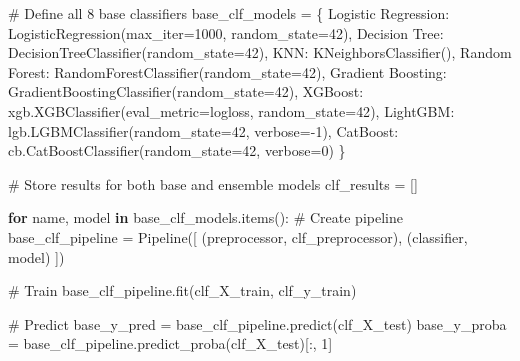 \documentclass[
  letterpaper,
  DIV=11,
  numbers=noendperiod]{scrreprt}
\newenvironment{Shaded}{\begin{snugshade}}{\end{snugshade}}
\newcommand{\CommentTok}[1]{\textcolor[rgb]{0.37,0.37,0.37}{#1}}
\newcommand{\ControlFlowTok}[1]{\textcolor[rgb]{0.00,0.23,0.31}{\textbf{#1}}}
\newcommand{\DecValTok}[1]{\textcolor[rgb]{0.68,0.00,0.00}{#1}}
\newcommand{\KeywordTok}[1]{\textcolor[rgb]{0.00,0.23,0.31}{\textbf{#1}}}
\newcommand{\NormalTok}[1]{\textcolor[rgb]{0.00,0.23,0.31}{#1}}
\newcommand{\OperatorTok}[1]{\textcolor[rgb]{0.37,0.37,0.37}{#1}}
\newcommand{\StringTok}[1]{\textcolor[rgb]{0.13,0.47,0.30}{#1}}
\begin{document}
\begin{Shaded}
\begin{Highlighting}[]
\CommentTok{\# Define all 8 base classifiers}
\NormalTok{base\_clf\_models }\OperatorTok{=}\NormalTok{ \{}
    \StringTok{\textquotesingle{}Logistic Regression\textquotesingle{}}\NormalTok{: LogisticRegression(max\_iter}\OperatorTok{=}\DecValTok{1000}\NormalTok{, random\_state}\OperatorTok{=}\DecValTok{42}\NormalTok{),}
    \StringTok{\textquotesingle{}Decision Tree\textquotesingle{}}\NormalTok{: DecisionTreeClassifier(random\_state}\OperatorTok{=}\DecValTok{42}\NormalTok{),}
    \StringTok{\textquotesingle{}KNN\textquotesingle{}}\NormalTok{: KNeighborsClassifier(),}
    \StringTok{\textquotesingle{}Random Forest\textquotesingle{}}\NormalTok{: RandomForestClassifier(random\_state}\OperatorTok{=}\DecValTok{42}\NormalTok{),}
    \StringTok{\textquotesingle{}Gradient Boosting\textquotesingle{}}\NormalTok{: GradientBoostingClassifier(random\_state}\OperatorTok{=}\DecValTok{42}\NormalTok{),}
    \StringTok{\textquotesingle{}XGBoost\textquotesingle{}}\NormalTok{: xgb.XGBClassifier(eval\_metric}\OperatorTok{=}\StringTok{\textquotesingle{}logloss\textquotesingle{}}\NormalTok{, random\_state}\OperatorTok{=}\DecValTok{42}\NormalTok{),}
    \StringTok{\textquotesingle{}LightGBM\textquotesingle{}}\NormalTok{: lgb.LGBMClassifier(random\_state}\OperatorTok{=}\DecValTok{42}\NormalTok{, verbose}\OperatorTok{={-}}\DecValTok{1}\NormalTok{),}
    \StringTok{\textquotesingle{}CatBoost\textquotesingle{}}\NormalTok{: cb.CatBoostClassifier(random\_state}\OperatorTok{=}\DecValTok{42}\NormalTok{, verbose}\OperatorTok{=}\DecValTok{0}\NormalTok{)}
\NormalTok{\}}

\CommentTok{\# Store results for both base and ensemble models}
\NormalTok{clf\_results }\OperatorTok{=}\NormalTok{ []}

\ControlFlowTok{for}\NormalTok{ name, model }\KeywordTok{in}\NormalTok{ base\_clf\_models.items():}
    \CommentTok{\# Create pipeline}
\NormalTok{    base\_clf\_pipeline }\OperatorTok{=}\NormalTok{ Pipeline([}
\NormalTok{        (}\StringTok{\textquotesingle{}preprocessor\textquotesingle{}}\NormalTok{, clf\_preprocessor),}
\NormalTok{        (}\StringTok{\textquotesingle{}classifier\textquotesingle{}}\NormalTok{, model)}
\NormalTok{    ])}
    
    \CommentTok{\# Train}
\NormalTok{    base\_clf\_pipeline.fit(clf\_X\_train, clf\_y\_train)}
    
    \CommentTok{\# Predict}
\NormalTok{    base\_y\_pred }\OperatorTok{=}\NormalTok{ base\_clf\_pipeline.predict(clf\_X\_test)}
\NormalTok{    base\_y\_proba }\OperatorTok{=}\NormalTok{ base\_clf\_pipeline.predict\_proba(clf\_X\_test)[:, }\DecValTok{1}\NormalTok{]}
    

\end{Highlighting}
\end{Shaded}
\end{document}

